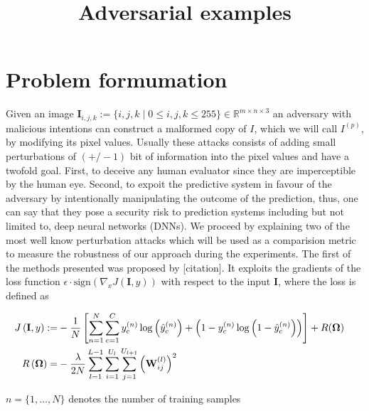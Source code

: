\documentclass[11pt,twoside,a4paper]{article}
\begin{document}
\title{Adversarial examples}
\maketitle

\section{Problem formumation}
Given an image
$\textbf{I}_{i,j,k} := \{i, j, k\; |\; 0\le i, j, k\le 255\} \in
\mathbb{R}^{m \times n \times 3}$ an adversary with malicious intentions can
construct a malformed copy of $I$, which we will call
$I^{\left( p \right)}$, by modifying its pixel values. Usually these
attacks consists of adding small perturbations of $\left(+/-1\right)$
bit of information into the pixel values and have a twofold
goal. First, to deceive any human evaluator since they are
imperceptible by the human eye. Second, to expoit the predictive
system in favour of the adversary by intentionally manipulating the
outcome of the prediction, thus, one can say that they pose a security
risk to prediction systems including but not limited to, deep neural
networks (DNNs). We proceed by explaining two of the most well know
perturbation attacks which will be used as a comparision metric to
measure the robustness of our approach during the experiments. The
first of the methods presented was proposed by [citation]. It exploits
the gradients of the loss function
$\epsilon \cdot \mbox{sign}\left( \nabla_{x}J\left( \textbf{I}, y \right) \right)$ with
respect to the input $\textbf{I}$, where the loss is defined as

\begin{align}
  J\left( \textbf{I}, y \right) :=& -\frac{1}{N}\left[
                                    \sum_{n=1}^{N}\sum_{c=1}^{C} y_{c}^{\left( n \right)}\log\left(
                                    \hat{y}_{c}^{\left( n \right)} \right) + \left( 1 - y_{c}^{\left( n
                                    \right)} \log\left( 1 - \hat{y}_{c}^{\left( n \right)} \right)
                                    \right) \right] + R(\bf{\Omega})
                                  & \\
  R\left( \bf{\Omega} \right) =&
                            -\frac{\lambda}{2N}\sum_{l=1}^{L-1}\sum_{i=1}^{U_{l}}\sum_{j=1}^{U_{l+1}}
                            {\left( \textbf{W}_{ij}^{\left( l \right)}
                            \right)}^{2}
\end{align}

$n = \{1,\ldots, N\}$ denotes the number of training samples
\end{document}
